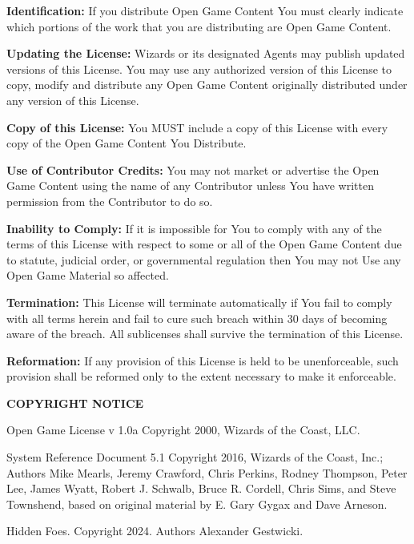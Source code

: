 \documentclass[letterpaper, 12pt, twocolumn]{article}
\def\projecttitle{Hidden Foes}
\begin{document}
\begin{footnotesize}
{\item \textbf{Identification:} If you distribute Open Game 
Content You must clearly indicate which portions of 
the work that you are distributing are Open Game 
Content.
\item \textbf{Updating the License:} Wizards or its designated 
Agents may publish updated versions of this License. 
You may use any authorized version of this License 
to copy, modify and distribute any Open Game 
Content originally distributed under any version of 
this License.
\item \textbf{Copy of this License:} You MUST include a copy of 
this License with every copy of the Open Game 
Content You Distribute.
\item \textbf{Use of Contributor Credits:} You may not market 
or advertise the Open Game Content using the name 
of any Contributor unless You have written 
permission from the Contributor to do so.
\item \textbf{Inability to Comply:} If it is impossible for You to 
comply with any of the terms of this License with 
respect to some or all of the Open Game Content due 
to statute, judicial order, or governmental regulation 
then You may not Use any Open Game Material so 
affected.
\item \textbf{Termination:} This License will terminate 
automatically if You fail to comply with all terms 
herein and fail to cure such breach within 30 days of 
becoming aware of the breach. All sublicenses shall 
survive the termination of this License.
\item \textbf{Reformation:} If any provision of this License is 
held to be unenforceable, such provision shall be 
reformed only to the extent necessary to make it 
enforceable.
\item \textbf{COPYRIGHT NOTICE}

Open Game License v 1.0a Copyright 2000, Wizards 
of the Coast, LLC.

System Reference Document 5.1 Copyright 2016, 
Wizards of the Coast, Inc.; Authors Mike Mearls, 
Jeremy Crawford, Chris Perkins, Rodney Thompson, 
Peter Lee, James Wyatt, Robert J. Schwalb, Bruce R. 
Cordell, Chris Sims, and Steve Townshend, based on 
original material by E. Gary Gygax and Dave Arneson.

\projecttitle. Copyright 2024. Authors Alexander Gestwicki.}
\end{footnotesize}
\end{document}
